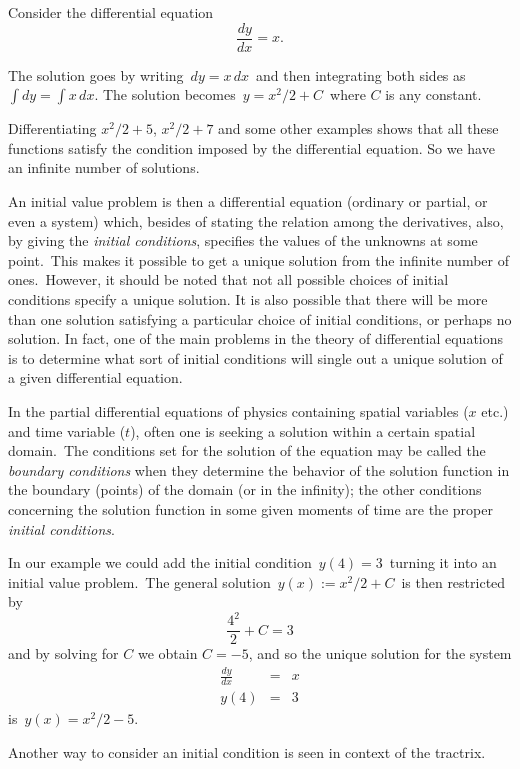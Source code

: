 \documentclass[12pt]{article}
\begin{document}
Consider the  differential equation
\[\frac{dy}{dx} = x.\]

The solution goes by writing\, $dy = x\,dx$\, and then integrating both sides as $\int dy = \int x\,dx$. The solution becomes\, $y = x^2/2+C$\, where $C$ is any constant. 

Differentiating $x^2/2+5$, $x^2/2+7$ and some other examples shows that all these functions satisfy the condition imposed by the differential equation. So we have an infinite number of solutions.

An initial value problem is then a differential equation (ordinary or partial, or even a system) which, besides of stating the relation among the derivatives,  also, by giving the {\em initial conditions}, specifies the values of the unknowns at some point.\, This makes it possible to get a unique solution from the infinite number of  ones.\, However, it should be noted that not all possible choices of initial conditions specify a unique solution.  It is also possible that there will be more than one solution satisfying a particular choice of initial conditions, or perhaps no solution.  In fact, one of the main problems in the theory of differential equations is to determine what sort of initial conditions will single out a unique solution of a given differential equation.

In the partial differential equations of physics containing spatial variables ($x$ etc.) and time variable ($t$), often one is seeking a solution within a certain spatial domain.\, The conditions set for the solution of the equation may be called the {\em boundary conditions} when they determine the behavior of the solution function in the boundary (points) of the domain (or in the infinity); the other conditions concerning the solution function in some given moments of time are the proper {\em initial conditions}.

In our example we could add the initial condition\, $y(4) = 3$\, turning it into an initial value problem.\, The general solution\, $y(x) := x^2/2+C$\, is then restricted by 
\[\frac{4^2}{2}+C = 3\]
and by solving for $C$ we obtain $C = -5$, and so the unique solution for the system
\begin{eqnarray*}
\frac{dy}{dx}&=&x\\
y(4)&=&3
\end{eqnarray*}
is \,$y(x) = x^2/2-5$.

Another way to consider an initial condition is seen in context of the tractrix.\\
\end{document}
